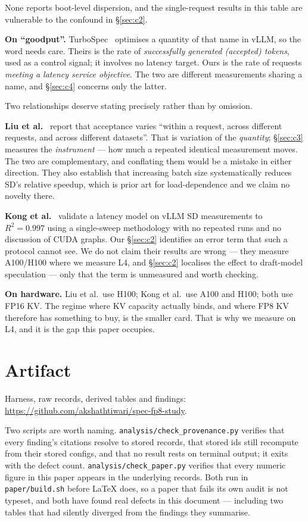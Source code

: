 \documentclass[11pt]{article}
\newcommand{\tw}[1]{\texttt{\small #1}}
\begin{document}
\noindent
None reports boot-level dispersion, and the single-request results in this
table are vulnerable to the confound in \S\ref{sec:c2}.

\textbf{On ``goodput''.} TurboSpec~\cite{liu2024turbospec} optimises a
quantity of that name in vLLM, so the word needs care. Theirs is the rate of
\emph{successfully generated (accepted) tokens}, used as a control signal;
it involves no latency target. Ours is the rate of requests \emph{meeting a
latency service objective}. The two are different measurements sharing a
name, and \S\ref{sec:c4} concerns only the latter.

Two relationships deserve stating precisely rather than by omission.

\textbf{Liu et al.}~\cite{liu2026illusion} report that acceptance varies
``within a request, across different requests, and across different
datasets''. That is variation of the \emph{quantity}; \S\ref{sec:c3} measures
the \emph{instrument} --- how much a repeated identical measurement moves.
The two are complementary, and conflating them would be a mistake in either
direction. They also establish that increasing batch size systematically
reduces SD's relative speedup, which is prior art for load-dependence and we
claim no novelty there.

\textbf{Kong et al.}~\cite{kong2026latency} validate a latency model on vLLM
SD measurements to $R^2 = 0.997$ using a single-sweep methodology with no
repeated runs and no discussion of CUDA graphs. Our \S\ref{sec:c2} identifies
an error term that such a protocol cannot see. We do not claim their results
are wrong --- they measure A100/H100 where we measure L4, and
\S\ref{sec:c2} localises the effect to draft-model speculation --- only that
the term is unmeasured and worth checking.

\textbf{On hardware.} Liu et al.\ use H100; Kong et al.\ use A100 and H100;
both use FP16 KV. The regime where KV capacity actually binds, and where FP8
KV therefore has something to buy, is the smaller card. That is why we
measure on L4, and it is the gap this paper occupies.

\section{Artifact}\label{sec:artifact}

Harness, raw records, derived tables and findings:
\url{https://github.com/akshathtiwari/spec-fp8-study}.

Two scripts are worth naming. \tw{analysis/check\_provenance.py} verifies
that every finding's citations resolve to stored records, that stored ids
still recompute from their stored configs, and that no result rests on
terminal output; it exits with the defect count. \tw{analysis/check\_paper.py}
verifies that every numeric figure in this paper appears in the underlying
records. Both run in \tw{paper/build.sh} before \LaTeX{} does, so a paper
that fails its own audit is not typeset, and both have found real defects in
this document --- including two tables that had silently diverged from the
findings they summarise.
\end{document}
